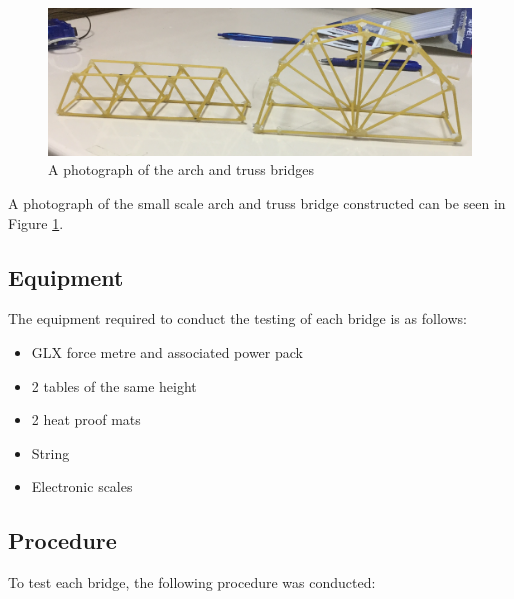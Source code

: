 \documentclass[a4paper,11pt]{article}
\begin{document}
\begin{figure}
\begin{center}
\includegraphics[width=\textwidth]{figures/config-photo.png}
\end{center}
\caption{A photograph of the arch and truss bridges}
\label{config:photo}
\end{figure}

A photograph of the small scale arch and truss bridge constructed can be seen
in Figure
\ref{config:photo}.


\subsection{Equipment}

The equipment required to conduct the testing of each bridge is as follows:

\begin{itemize}
\item GLX force metre and associated power pack
\item 2 tables of the same height
\item 2 heat proof mats
\item String
\item Electronic scales
\end{itemize}


\subsection{Procedure}

To test each bridge, the following procedure was conducted:
\end{document}
